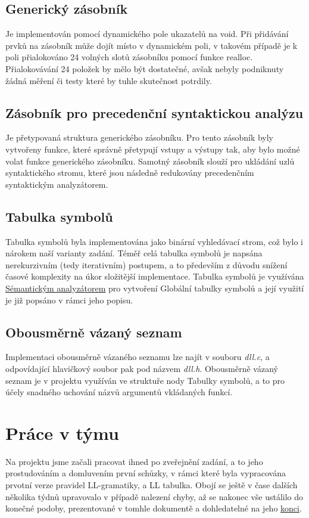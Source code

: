 \documentclass[a4paper, 11pt]{article}
\begin{document}
	\subsection{Generický zásobník}
	Je implementován pomocí dynamického pole ukazatelů na void. Při přidávání prvků na zásobník může dojít místo v dynamickém poli, v takovém případě je k 
	poli přialokováno 24 volných slotů zásobníku pomocí funkce realloc. Přialokovávání 24 položek by mělo být dostatečné, avšak nebyly podniknuty žádná měření 
	či testy které by tuhle skutečnost potrdily.
    
	\subsection{Zásobník pro precedenční syntaktickou analýzu}
	Je přetypovaná struktura generického zásobníku. Pro tento zásobník byly vytvořeny funkce, které správně přetypují vstupy a výstupy tak, aby bylo možné 
	volat funkce generického zásobníku. Samotný zásobník slouží pro ukládání uzlů syntaktického stromu, které jsou následně redukovány precedenčním 
	syntaktickým analyzátorem.

	\subsection{Tabulka symbolů}
	\label{symtab}
	Tabulka symbolů byla implementována jako binární vyhledávací strom, což bylo i nárokem naší varianty zadání. Téměř celá tabulka symbolů je napsána 
	nerekurzivním (tedy iterativním) postupem, a to především z důvodu snížení časové komplexity na úkor složitější implementace. Tabulka symbolů je 
	využívána \hyperref[semantic]{Sémantickým analyzátorem} pro vytvoření Globální tabulky symbolů a její využití je již popsáno v rámci jeho popisu.

	\subsection{Obousměrně vázaný seznam}
	Implementaci obousměrně vázaného seznamu lze najít v souboru \textit{dll.c}, a odpovídající hlavičkový soubor pak pod názvem \textit{dll.h}. Obousměrně 
	vázaný seznam je v projektu využíván ve struktuře nody Tabulky symbolů, a to pro účely snadného uchování názvů argumentů vkládaných funkcí.
	\section{Práce v týmu}
	Na projektu jsme začali pracovat ihned po zveřejnění zadání, a to jeho prostudováním a domluvením první schůzky, v rámci které byla vypracována prvotní 
	verze pravidel LL-gramatiky, a LL tabulka. Obojí se ještě v čase dalších několika týdnů upravovalo v případě nalezení chyby, až se nakonec vše ustálilo do 
	konečné podoby, prezentované v tomhle dokumentě a dohledatelné na jeho \hyperref[gram]{konci}.
	
\end{document}
